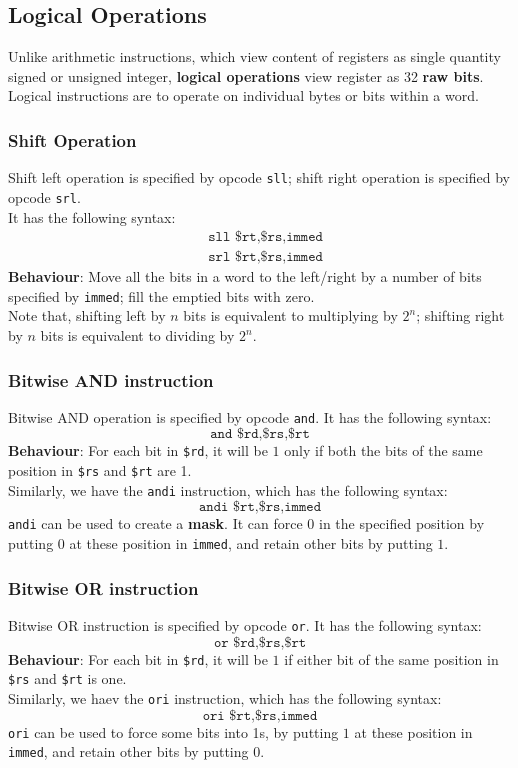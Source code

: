 \documentclass[12pt]{article}
\theoremstyle{definition}
\begin{document}
\subsection{Logical Operations}
Unlike arithmetic instructions, which view content of registers as single quantity signed or unsigned integer, \textbf{logical operations} view register as 32 \textbf{raw bits}.\\Logical instructions are to operate on individual bytes or bits within a word.
\subsubsection{Shift Operation}
Shift left operation is specified by opcode \texttt{sll}; shift right operation is specified by opcode \texttt{srl}.\\
It has the following syntax:
\begin{align*}
&\texttt{sll \$rt,\$rs,immed}\\
&\texttt{srl \$rt,\$rs,immed}
\end{align*}
\textbf{Behaviour}: Move all the bits in a word to the left/right by a number of bits specified by \texttt{immed}; fill the emptied bits with zero.\\
Note that, shifting left by $n$ bits is equivalent to multiplying by $2^n$; shifting right by $n$ bits is equivalent to dividing by $2^n$.
\subsubsection{Bitwise AND instruction}
Bitwise AND operation is specified by opcode \texttt{and}. It has the following syntax:
\[
\texttt{and \$rd,\$rs,\$rt}
\]
\textbf{Behaviour}: For each bit in \texttt{\$rd}, it will be $1$ only if both the bits of the same position in \texttt{\$rs} and \texttt{\$rt} are 1.\\
Similarly, we have the \texttt{andi} instruction, which has the following syntax:
\[
\texttt{andi \$rt,\$rs,immed}
\]
\texttt{andi} can be used to create a \textbf{mask}. It can force $0$ in the specified position by putting $0$ at these position in \texttt{immed}, and retain other bits by putting $1$.
\subsubsection{Bitwise OR instruction}
Bitwise OR instruction is specified by opcode \texttt{or}. It has the following syntax:
\[
\texttt{or \$rd,\$rs,\$rt}
\]
\textbf{Behaviour}: For each bit in \texttt{\$rd}, it will be $1$ if either bit of the same position in \texttt{\$rs} and \texttt{\$rt} is one.\\
Similarly, we haev the \texttt{ori} instruction, which has the following syntax:
\[
\texttt{ori \$rt,\$rs,immed}
\]
\texttt{ori} can be used to force some bits into 1s, by putting $1$ at these position in \texttt{immed}, and retain other bits by putting $0$.
\end{document}
